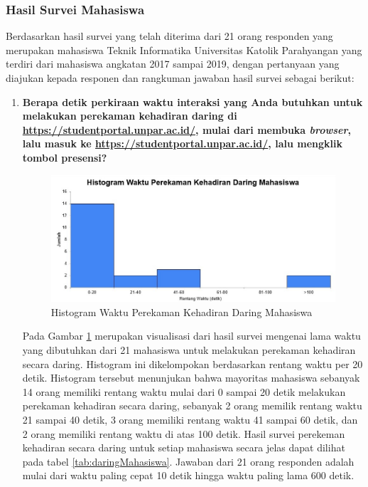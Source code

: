 \subsubsection{Hasil Survei Mahasiswa}
Berdasarkan hasil survei yang telah diterima dari 21 orang responden yang merupakan mahasiswa Teknik Informatika Universitas Katolik
Parahyangan yang terdiri dari mahasiswa angkatan 2017 sampai 2019, dengan pertanyaan yang diajukan kepada responen dan rangkuman jawaban hasil survei sebagai berikut:
\begin{enumerate}
	\item \textbf{Berapa detik perkiraan waktu interaksi yang Anda butuhkan untuk melakukan perekaman kehadiran daring di \url{https://studentportal.unpar.ac.id/}, mulai dari membuka \textit{browser}, lalu masuk ke \url{https://studentportal.unpar.ac.id/}, lalu mengklik tombol presensi?}
	\begin{figure}[H]
		\centering
		\includegraphics[scale=0.6]{Gambar/DaringMahasiswa.jpg}
		\caption{Histogram Waktu Perekaman Kehadiran Daring Mahasiswa} 
		\label{fig:DaringMahasiswa}
	\end{figure}
	Pada Gambar \ref{fig:DaringMahasiswa} merupakan visualisasi dari hasil survei mengenai lama waktu yang dibutuhkan dari 21 mahasiswa untuk melakukan perekaman kehadiran secara daring. Histogram ini dikelompokan berdasarkan rentang waktu per 20 detik. Histogram tersebut menunjukan bahwa mayoritas mahasiswa sebanyak 14 orang memiliki rentang waktu mulai dari 0 sampai 20 detik melakukan perekaman kehadiran secara daring, sebanyak 2 orang memilik rentang waktu 21 sampai 40 detik, 3 orang memiliki rentang waktu 41 sampai 60 detik, dan 2 orang memiliki rentang waktu di atas 100 detik. Hasil survei perekeman kehadiran secara daring untuk setiap mahasiswa secara jelas dapat dilihat pada tabel \ref{tab:daringMahasiswa}. Jawaban dari 21 orang responden adalah mulai dari waktu paling cepat 10 detik hingga waktu paling lama 600 detik.
	\begin{table}[ht]			

\end{table}
\end{enumerate}
